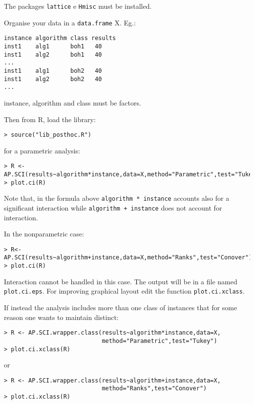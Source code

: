 \documentclass[a4paper,11pt]{article}
\begin{document}
The packages \texttt{lattice} e \texttt{Hmisc} must be installed.

Organise your data in a \texttt{data.frame} X. Eg.:

\begin{verbatim}
instance algorithm class results
inst1    alg1      boh1   40
inst1    alg2      boh1   40
...
inst1    alg1      boh2   40
inst1    alg2      boh2   40
...
\end{verbatim}

instance, algorithm and class must be factors.

Then from R, load the library:

\begin{verbatim}
> source("lib_posthoc.R")
\end{verbatim}

for a parametric analysis:

\begin{verbatim}
> R <-AP.SCI(results~algorithm*instance,data=X,method="Parametric",test="Tukey")
> plot.ci(R)
\end{verbatim}

Note that, in the formula above \texttt{algorithm * instance} accounts
also for a significant interaction while \texttt{algorithm + instance}
does not account for interaction.

\smallskip

In the nonparametric case:

\begin{verbatim}
> R<-AP.SCI(results~algorithm+instance,data=X,method="Ranks",test="Conover")
> plot.ci(R)
\end{verbatim}

Interaction cannot be handled in this case. The output will be in a file
named \texttt{plot.ci.eps}. For
improving graphical layout edit the function \texttt{plot.ci.xclass}.



\bigskip

If instead the analysis includes more than one class of instances that
for some reason one wants to maintain distinct:

\begin{verbatim}
> R <- AP.SCI.wrapper.class(results~algorithm*instance,data=X,
                            method="Parametric",test="Tukey")
> plot.ci.xclass(R)
\end{verbatim}

or

\begin{verbatim}
> R <- AP.SCI.wrapper.class(results~algorithm+instance,data=X,
                            method="Ranks",test="Conover")
> plot.ci.xclass(R)
\end{verbatim}
\end{document}
